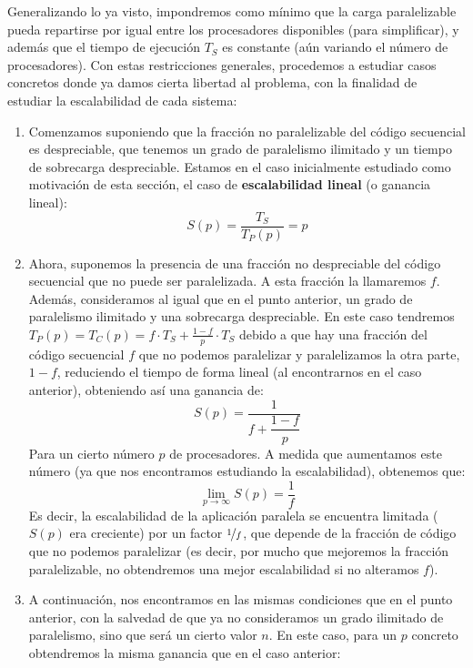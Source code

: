 Generalizando lo ya visto, impondremos como mínimo que la carga paralelizable pueda repartirse por igual entre los procesadores disponibles (para simplificar), y además que el tiempo de ejecución $T_S$ es constante (aún variando el número de procesadores). Con estas restricciones generales, procedemos a estudiar casos concretos donde ya damos cierta libertad al problema, con la finalidad de estudiar la escalabilidad de cada sistema:
\begin{enumerate}
    \item Comenzamos suponiendo que la fracción no paralelizable del código secuencial es despreciable, que tenemos un grado de paralelismo ilimitado y un tiempo de sobrecarga despreciable. Estamos en el caso inicialmente estudiado como motivación de esta sección, el caso de \textbf{escalabilidad lineal} (o ganancia lineal):
        \begin{equation*}
            S(p) = \dfrac{T_S}{T_P(p)} = p
        \end{equation*}
    \item Ahora, suponemos la presencia de una fracción no despreciable del código secuencial que no puede ser paralelizada. A esta fracción la llamaremos $f$. Además, consideramos al igual que en el punto anterior, un grado de paralelismo ilimitado y una sobrecarga despreciable. En este caso tendremos $T_P(p) = T_C(p) = f\cdot T_S + \frac{1-f}{p}\cdot T_S$ debido a que hay una fracción del código secuencial $f$ que no podemos paralelizar y paralelizamos la otra parte, $1-f$, reduciendo el tiempo de forma lineal (al encontrarnos en el caso anterior), obteniendo así una ganancia de:
        \begin{equation*}
            S(p) = \dfrac{1}{f+\dfrac{1-f}{p}}
        \end{equation*}
        Para un cierto número $p$ de procesadores. A medida que aumentamos este número (ya que nos encontramos estudiando la escalabilidad), obtenemos que:
        \begin{equation*}
            \lim_{p\to\infty}S(p) = \dfrac{1}{f}
        \end{equation*}
        Es decir, la escalabilidad de la aplicación paralela se encuentra limitada ($S(p)$ era creciente) por un factor $\nicefrac{1}{f}$, que depende de la fracción de código que no podemos paralelizar (es decir, por mucho que mejoremos la fracción paralelizable, no obtendremos una mejor escalabilidad si no alteramos $f$).
    \item A continuación, nos encontramos en las mismas condiciones que en el punto anterior, con la salvedad de que ya no consideramos un grado ilimitado de paralelismo, sino que será un cierto valor $n$. En este caso, para un $p$ concreto obtendremos la misma ganancia que en el caso anterior:

\end{enumerate}
